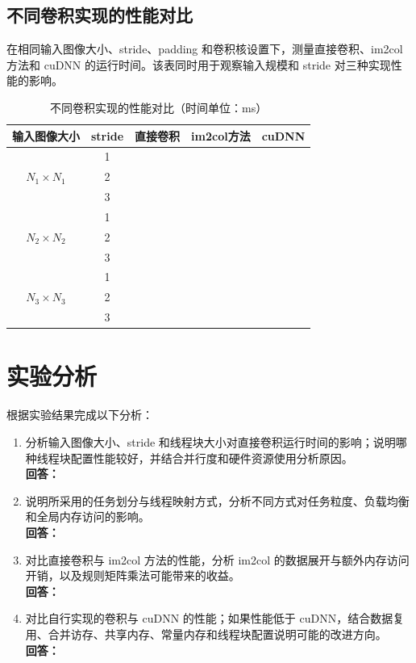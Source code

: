 \documentclass{SYSUReport}
\begin{document}
\subsection{不同卷积实现的性能对比}
在相同输入图像大小、stride、padding 和卷积核设置下，测量直接卷积、im2col 方法和 cuDNN 的运行时间。该表同时用于观察输入规模和 stride 对三种实现性能的影响。
\begin{table}[H]
\centering
\caption{不同卷积实现的性能对比（时间单位：ms）}
\label{tab:conv_compare}
\begin{tabular}{|c|c|c|c|c|}
\hline
输入图像大小 & stride & 直接卷积 & im2col方法 & cuDNN \\
\hline
\multirow{3}{*}{$N_1\times N_1$}
& 1 & & & \\
\cline{2-5}
& 2 & & & \\
\cline{2-5}
& 3 & & & \\
\hline
\multirow{3}{*}{$N_2\times N_2$}
& 1 & & & \\
\cline{2-5}
& 2 & & & \\
\cline{2-5}
& 3 & & & \\
\hline
\multirow{3}{*}{$N_3\times N_3$}
& 1 & & & \\
\cline{2-5}
& 2 & & & \\
\cline{2-5}
& 3 & & & \\
\hline
\end{tabular}
\end{table}

\section{实验分析}
根据实验结果完成以下分析：
\begin{enumerate}
    \item 分析输入图像大小、stride 和线程块大小对直接卷积运行时间的影响；说明哪种线程块配置性能较好，并结合并行度和硬件资源使用分析原因。\\
    \textbf{回答：}

    \item 说明所采用的任务划分与线程映射方式，分析不同方式对任务粒度、负载均衡和全局内存访问的影响。\\
    \textbf{回答：}

    \item 对比直接卷积与 im2col 方法的性能，分析 im2col 的数据展开与额外内存访问开销，以及规则矩阵乘法可能带来的收益。\\
    \textbf{回答：}

    \item 对比自行实现的卷积与 cuDNN 的性能；如果性能低于 cuDNN，结合数据复用、合并访存、共享内存、常量内存和线程块配置说明可能的改进方向。\\
    \textbf{回答：}
\end{enumerate}
\end{document}
